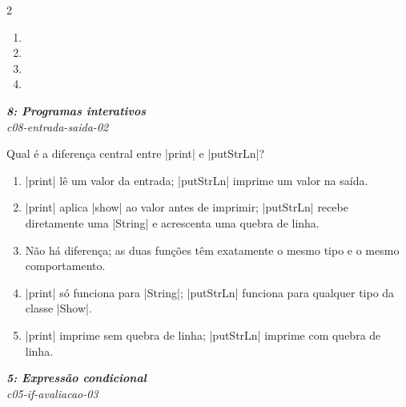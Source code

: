 \documentclass[a4paper,10pt,brazil]{article}
\begin{document}
\begin{multicols}{2}
\begin{enumerate}
  \item {}

  \item {}

  \item {}

  \item {}


\end{enumerate}

\begin{flushright}
  \footnotesize
  \textit{\textbf{8: Programas interativos}}\\
  \textit{c08-entrada-saida-02}\\

\end{flushright}
Qual é a diferença central entre \haskellinline|print| e \haskellinline|putStrLn|?

\begin{enumerate}
  \item \haskellinline|print| lê um valor da entrada; \haskellinline|putStrLn| imprime um valor na saída.

  \item \haskellinline|print| aplica \haskellinline|show| ao valor antes de imprimir; \haskellinline|putStrLn| recebe diretamente uma \haskellinline|String| e acrescenta uma quebra de linha.

  \item Não há diferença; as duas funções têm exatamente o mesmo tipo e o mesmo comportamento.

  \item \haskellinline|print| só funciona para \haskellinline|String|; \haskellinline|putStrLn| funciona para qualquer tipo da classe \haskellinline|Show|.

  \item \haskellinline|print| imprime sem quebra de linha; \haskellinline|putStrLn| imprime com quebra de linha.


\end{enumerate}

\begin{flushright}
  \footnotesize
  \textit{\textbf{5: Expressão condicional}}\\
  \textit{c05-if-avaliacao-03}\\


\end{flushright}
\end{multicols}
\end{document}
